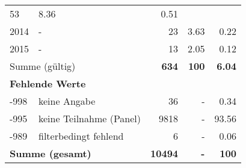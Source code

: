 \begin{longtable}{lXrrr}
       \num{53} &
       \num[round-mode=places,round-precision=2]{8.36} &
         \num[round-mode=places,round-precision=2]{0.51} \\

     2014 &
     \multicolumn{1}{X}{ -  } &


       \num{23} &
       \num[round-mode=places,round-precision=2]{3.63} &
         \num[round-mode=places,round-precision=2]{0.22} \\

     2015 &
     \multicolumn{1}{X}{ -  } &


       \num{13} &
       \num[round-mode=places,round-precision=2]{2.05} &
         \num[round-mode=places,round-precision=2]{0.12} \\
     \midrule
     \multicolumn{2}{l}{Summe (gültig)} &
       \textbf{\num{634}} &
     \textbf{\num{100}} &
       \textbf{\num[round-mode=places,round-precision=2]{6.04}} \\
     \multicolumn{5}{l}{\textbf{Fehlende Werte}}\\
       -998 &
       keine Angabe &
         \num{36} &
        - &
         \num[round-mode=places,round-precision=2]{0.34} \\
       -995 &
       keine Teilnahme (Panel) &
         \num{9818} &
        - &
         \num[round-mode=places,round-precision=2]{93.56} \\
       -989 &
       filterbedingt fehlend &
         \num{6} &
        - &
         \num[round-mode=places,round-precision=2]{0.06} \\
     \midrule
     \multicolumn{2}{l}{\textbf{Summe (gesamt)}} &
          \textbf{\num{10494}} &
        \textbf{-} &
        \textbf{\num{100}} \\
     \bottomrule
     \end{longtable}
     
